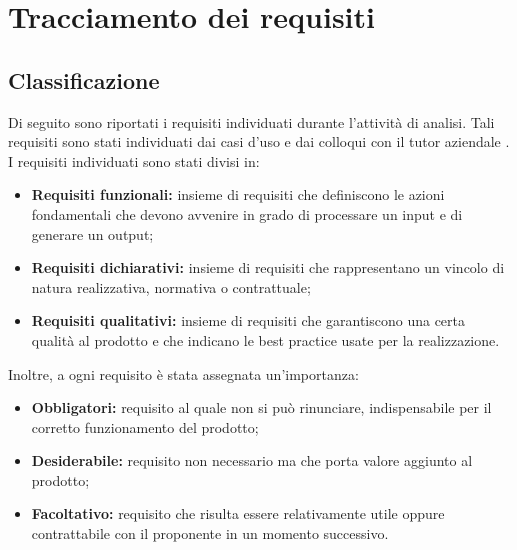 \section{Tracciamento dei requisiti}\label{sec:tracciamento-dei-requisiti}

\setcounter{rowcount}{0}
\setcounter{subCount}{0}

\subsection{Classificazione}\label{subsec:classificazione}
Di seguito sono riportati i requisiti individuati durante l'attività di analisi.
Tali requisiti sono stati individuati dai casi d'uso e dai colloqui con il tutor aziendale \tutorAziendale.
I requisiti individuati sono stati divisi in:
\begin{itemize}
    \item \textbf{Requisiti funzionali:} insieme di requisiti che definiscono le azioni fondamentali che devono avvenire in grado di processare un input e di generare un output;
    \item \textbf{Requisiti dichiarativi:} insieme di requisiti che rappresentano un vincolo di natura realizzativa, normativa o contrattuale;
    \item \textbf{Requisiti qualitativi:} insieme di requisiti che garantiscono una certa qualità al prodotto e che indicano le best practice usate per la realizzazione.
\end{itemize}
Inoltre, a ogni requisito è stata assegnata un'importanza:
\begin{itemize}
    \item \textbf{Obbligatori:} requisito al quale non si può rinunciare, indispensabile per il corretto funzionamento del prodotto;
    \item \textbf{Desiderabile:} requisito non necessario ma che porta valore aggiunto al prodotto;
    \item \textbf{Facoltativo:} requisito che risulta essere relativamente utile oppure contrattabile con il proponente in un momento successivo.
\end{itemize}

